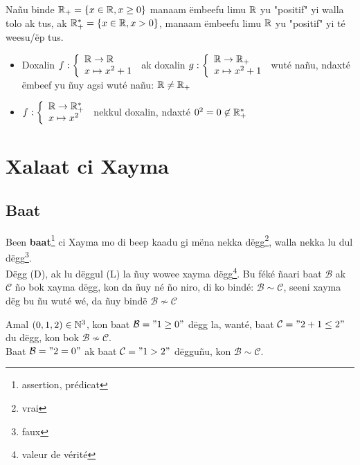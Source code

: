 \documentclass[twoside, a4paper]{article}
\begin{document}
Nañu binde $\mathbb{R}_{+} = \{x \in \mathbb{R}, x \geq 0 \}$ manaam ëmbeefu limu $\mathbb{R}$ yu "positif" yi walla tolo ak tus, ak $\mathbb{R}_{+}^{*} = \{x \in \mathbb{R}, x > 0 \}$, manaam ëmbeefu limu $\mathbb{R}$ yu "positif" yi té weesu/ëp tus.

\begin{itemize}
    \item Doxalin $f: \left\{
    \begin{array}{ll}
        \mathbb{R} \rightarrow{} \mathbb{R} \\
        x \mapsto x^2+1 
    \end{array}
\right.$ ak doxalin $g: \left\{
    \begin{array}{ll}
        \mathbb{R} \rightarrow{} \mathbb{R}_{+} \\
        x \mapsto x^2+1 
    \end{array}
\right.$ wuté nañu, ndaxté ëmbeef yu ñuy agsi wuté nañu: $\mathbb{R} \neq \mathbb{R}_{+}$ 

    \item $f: \left\{
    \begin{array}{ll}
        \mathbb{R} \rightarrow{} \mathbb{R}_{+}^{*} \\
        x \mapsto x^2 
    \end{array}
\right.$ nekkul doxalin, ndaxté $0^2=0\not\in \mathbb{R}_{+}^{*}$
\end{itemize}


\section{Xalaat ci Xayma}

\subsection{Baat}
\begin{tcolorbox}[enhanced jigsaw,breakable,pad at break*=1mm, colback=red!5!white,colframe=white!75!black,title= Téeki,
  watermark color=white]
 Been \textbf{baat}\footnote{assertion, prédicat} ci Xayma mo di beep kaadu gi mëna nekka dëgg\footnote{vrai}, walla nekka lu dul dëgg\footnote{faux}.\\
 Dëgg (D), ak lu dëggul (L) la ñuy wowee xayma dëgg\footnote{valeur de vérité}. Bu féké ñaari baat $\mathcal{B}$ ak $\mathcal{C}$ ño bok xayma dëgg, kon da ñuy né ño niro, di ko bindé: $\mathcal{B}\sim \mathcal{C}$, seeni xayma dëg bu ñu wuté wé, da ñuy bindë $\mathcal{B}\not\sim \mathcal{C}$
\end{tcolorbox}
Amal  $(0,1,2)\in \mathbb{N}^3$, kon baat $\mathcal{B} = "1 \geq 0"$ dëgg la, wanté, baat $\mathcal{C} = "2 + 1 \leq 2"$ du dëgg, kon bok $\mathcal{B}\not\sim \mathcal{C}$.\\
Baat $\mathcal{B}="2=0"$ ak baat $\mathcal{C}="1>2"$ dëgguñu, kon $\mathcal{B}\sim \mathcal{C}$.
\end{document}
